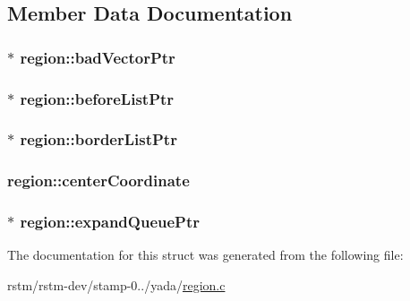 \subsection{Member Data Documentation}
\hypertarget{structregion_a90aa5790bd32ee48f5c3a95b6c32ea0a}{
\subsubsection[{bad\-Vector\-Ptr}]{$\ast$ region\-::bad\-Vector\-Ptr}}\label{structregion_a90aa5790bd32ee48f5c3a95b6c32ea0a}
\hypertarget{structregion_ab4e57c7cf6618d2c344e4515b1adb4b5}{
\subsubsection[{before\-List\-Ptr}]{$\ast$ region\-::before\-List\-Ptr}}\label{structregion_ab4e57c7cf6618d2c344e4515b1adb4b5}
\hypertarget{structregion_a49123f77284c0d931b2bedf3909294a6}{
\subsubsection[{border\-List\-Ptr}]{$\ast$ region\-::border\-List\-Ptr}}\label{structregion_a49123f77284c0d931b2bedf3909294a6}
\hypertarget{structregion_a223aa34627b18bcfb3f48cbd1be8452d}{
\subsubsection[{center\-Coordinate}]{ region\-::center\-Coordinate}}\label{structregion_a223aa34627b18bcfb3f48cbd1be8452d}
\hypertarget{structregion_a477cd3e9eb118a028f0513bf90fb274f}{
\subsubsection[{expand\-Queue\-Ptr}]{$\ast$ region\-::expand\-Queue\-Ptr}}\label{structregion_a477cd3e9eb118a028f0513bf90fb274f}


The documentation for this struct was generated from the following file\-:\begin{DoxyCompactItemize}
\item 
rstm/rstm-\/dev/stamp-\/0../yada/\hyperlink{region_8c}{region.\-c}\end{DoxyCompactItemize}
